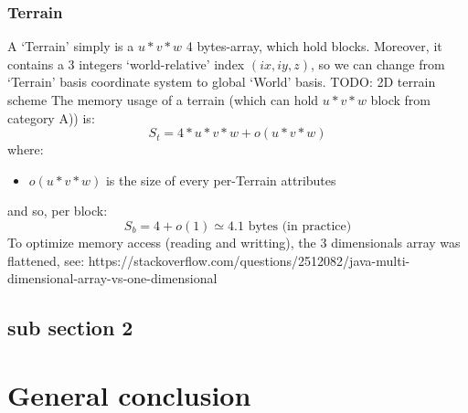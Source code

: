 \documentclass[11pt]{article}
\begin{document}
			\subsubsection{Terrain}
				A `Terrain' simply is a $u*v*w$ 4 bytes-array, which hold blocks. Moreover, it contains a 3 integers `world-relative'
				index $(ix, iy, z)$, so we can change from `Terrain' basis coordinate system to global `World' basis.
				\newline
				TODO: 2D terrain scheme
				\newline
				\newline
				The memory usage of a terrain (which can hold $u*v*w$ block from category A)) is:
				\[S_{t}=4 * u * v * w + o(u*v*w)\]
				where:
				\begin{itemize}
					\item $o(u*v*w)$ is the size of every per-Terrain attributes
				\end{itemize}
				and so, per block:
				\newline
				\[S_{b}=4 + o(1) \simeq4.1 \textrm{ bytes (in practice)}\]							
				\newline
				\newline
				To optimize memory access (reading and writting), the 3 dimensionals array was flattened, see:
				\newline
				https://stackoverflow.com/questions/2512082/java-multi-dimensional-array-vs-one-dimensional				
		\subsection{sub section 2}
	\newpage
	
	\section{General conclusion}
	\newpage
	
	\nocite{*}
	
	
\end{document}
